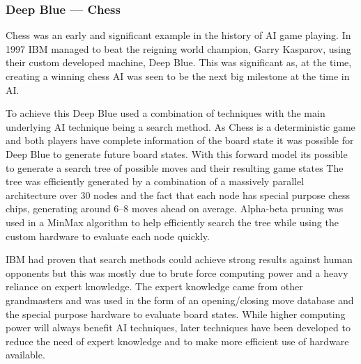 \documentclass[a4paper]{article}
\begin{document}
\subsubsection{Deep Blue --- Chess}
Chess was an early and significant example in the history of AI game playing.
In 1997 IBM managed to beat the reigning world champion, Garry Kasparov, using their custom developed machine, Deep Blue\cite{deepBlue}.
This was significant as, at the time, creating a winning chess AI was seen to be the next big milestone at the time in AI\@.
\par
To achieve this Deep Blue used a combination of techniques with the main underlying AI technique being a search method.
As Chess is a deterministic game and both players have complete information of the board state it was possible for Deep Blue to generate future board states.
With this forward model its possible to generate a search tree of possible moves and their resulting game states
The tree was efficiently generated by a combination of a massively parallel architecture over 30 nodes and the fact that each node has special purpose chess chips, generating around 6--8 moves ahead on average.
Alpha-beta pruning was used in a MinMax algorithm to help efficiently search the tree while using the custom hardware to evaluate each node quickly.
\par
IBM had proven that search methods could achieve strong results against human opponents but this was mostly due to brute force computing power and a heavy reliance on expert knowledge.
The expert knowledge came from other grandmasters and was used in the form of an opening/closing move database and the special purpose hardware to evaluate board states.
While higher computing power will always benefit AI techniques, later techniques have been developed to reduce the need of expert knowledge and to make more efficient use of hardware available.
\end{document}
